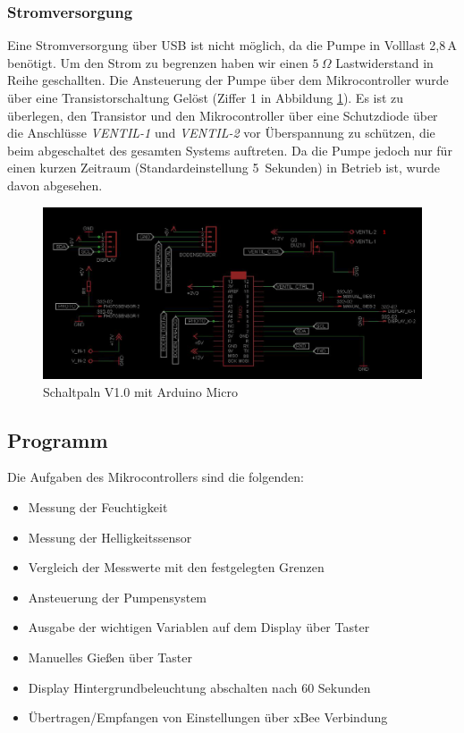 ﻿\documentclass[]{IEEEtran}
\begin{document}
	
\subsubsection{Stromversorgung}

Eine Stromversorgung über USB ist nicht möglich, da die Pumpe in Volllast 2,8\,A benötigt. Um den Strom zu begrenzen haben wir einen \begin{math}5~\Omega\end{math} Lastwiderstand in Reihe geschallten. Die Ansteuerung der Pumpe über dem Mikrocontroller wurde über eine Transistorschaltung Gelöst (Ziffer 1 in Abbildung \ref{fig-Schaltplanv1.0}). Es ist zu überlegen, den Transistor und den Mikrocontroller über eine Schutzdiode über die Anschlüsse \emph{VENTIL-1} und \emph{VENTIL-2} vor Überspannung zu schützen, die beim abgeschaltet des gesamten Systems auftreten. Da die Pumpe jedoch nur für einen kurzen Zeitraum (Standardeinstellung 5~Sekunden) in Betrieb ist, wurde davon abgesehen. 

\begin{figure}
	\centering
	\includegraphics[width=0.9\linewidth]{bilder/v1SchaltplanMicro0.JPG}
	\caption{Schaltpaln V1.0 mit Arduino Micro}
	\label{fig-Schaltplanv1.0}
\end{figure}

\subsection{Programm}
	

	Die Aufgaben des Mikrocontrollers sind die folgenden:
		\begin{itemize}
			\item Messung der Feuchtigkeit
			\item Messung der Helligkeitssensor
			\item Vergleich der Messwerte mit den festgelegten Grenzen
			\item Ansteuerung der Pumpensystem
			\item Ausgabe der wichtigen Variablen auf dem Display über Taster
			\item Manuelles Gießen über Taster
			\item Display Hintergrundbeleuchtung abschalten nach 60  Sekunden
			\item Übertragen/Empfangen von Einstellungen über xBee Verbindung
		\end{itemize}
		
\end{document}
